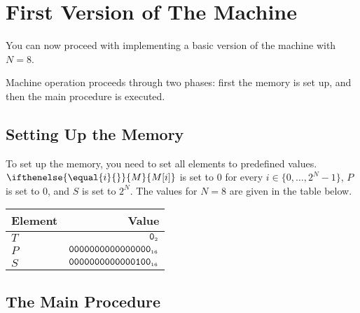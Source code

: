 \documentclass[a4paper,12pt]{article}
\newcommand{\num}[1]{\texttt{#1}}
\newcommand{\hex}[1]{\num{#1}_{\textup{\tiny 16}}}
\newcommand{\bin}[1]{\num{#1}_{\textup{\tiny 2}}}
\newcommand{\MEM}[1]{\ifthenelse{\equal{#1}{}}{M}{M[#1]}}
\newcommand{\PC}{P}
\newcommand{\SP}{S}
\newcommand{\TERM}{T}
\newcommand{\F}{\bin{0}}
\newcommand{\range}[2]{\{#1,\ldots,#2\}}
\newenvironment{memtable}{%
  \begin{trivlist}
    \item
    }{%
    \end{trivlist}}
\begin{document}
\section{First Version of The Machine}

You can now proceed with implementing a basic version of the machine with $N=8$.

Machine operation proceeds through two phases: first the memory is set up, and then the main procedure is executed.

\subsection{Setting Up the Memory}

To set up the memory, you need to set all elements to predefined values.
$\MEM{i}$ is set to 0 for every $i \in \range{0}{2^N-1}$, $\PC$ is set to $0$, and $\SP$ is set to $2^N$.
The values for $N=8$ are given in the table below.

\begin{memtable}
  \begin{tabular}{@{}lr@{}}
    Element  & Value                   \\
    \hline
    $\TERM$          & $\F$                      \\
    $\PC$            & $\hex{0000000000000000}$  \\
    $\SP$            & $\hex{0000000000000100}$  \\
    \hline
  \end{tabular}
\end{memtable}

\subsection{The Main Procedure}
\end{document}
